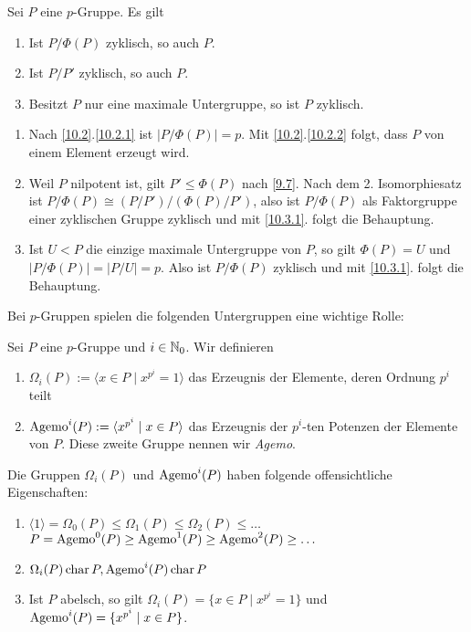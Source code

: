 \begin{folgerung}\label{10.3}
 Sei $P$ eine $p$-Gruppe. Es gilt 
\begin{enumerate}
 \item \label{10.3.1}Ist $P/\Phi(P)$ zyklisch, so auch $P$.
 \item Ist $P/P'$ zyklisch, so auch $P$.
 \item Besitzt $P$ nur eine maximale Untergruppe, so ist $P$ zyklisch.
\end{enumerate}

\end{folgerung}

\begin{beweis}\spspace
 \begin{enumerate}
 \item Nach \ref{10.2}.\ref{10.2.1} ist $|P/\Phi(P)|=p$. Mit \ref{10.2}.\ref{10.2.2} folgt, dass $P$ von einem Element erzeugt wird.
 \item Weil $P$ nilpotent ist, gilt $P'\leq \Phi(P)$ nach \ref{9.7}. Nach dem 2. Isomorphiesatz ist $P/\Phi(P)\cong (P/P')/(\Phi(P)/P')$, also ist $P/\Phi(P)$ als Faktorgruppe einer zyklischen Gruppe zyklisch und mit \ref{10.3.1}. folgt die Behauptung.
 \item Ist $U< P$ die einzige maximale Untergruppe von $P$, so gilt $\Phi(P)=U$ und $|P/\Phi(P)|=|P/U|=p$. Also ist $P/\Phi(P)$ zyklisch und mit \ref{10.3.1}. folgt die Behauptung.
\end{enumerate}

\end{beweis}

Bei $p$-Gruppen spielen die folgenden Untergruppen eine wichtige Rolle:
\begin{definition}
Sei $P$ eine $p$-Gruppe und $i\in \mathbb{N}_0$. Wir definieren
\begin{enumerate}
 \item $\Omega_i(P):=\langle x\in P\mid x^{p^i}=1\rangle$ das Erzeugnis der Elemente, deren Ordnung $p^i$ teilt
 \item $\text{Agemo}^i(P):=\langle x^{p^i}\mid x\in P\rangle$ das Erzeugnis der $p^i$-ten Potenzen der Elemente von $P$. Diese zweite Gruppe nennen wir \emph{Agemo}.
\end{enumerate}

 
\end{definition}
\begin{bemerkung}
 Die Gruppen $\Omega_i(P)$ und $\text{Agemo}^i(P)$ haben folgende offensichtliche Eigenschaften:
\begin{enumerate}
 \item $\langle 1\rangle=\Omega_0(P)\leq \Omega_1(P)\leq \Omega_2(P)\leq \ldots$\\
       $P=\text{Agemo}^0(P)\geq \text{Agemo}^1(P)\geq \text{Agemo}^2(P)\geq\ldots$
\item $\Omega_i(P)\operatorname{char} P, \text{Agemo}^i(P)\operatorname{char} P$
\item Ist $P$ abelsch, so gilt $\Omega_i(P)=\lbrace x\in P\mid x^{p^i}=1\rbrace$ und $\text{Agemo}^i(P)=\lbrace x^{p^i}\mid x\in P\rbrace$.
\end{enumerate}

\end{bemerkung}

